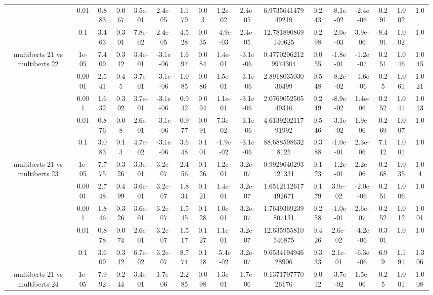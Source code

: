 \begin{tabular}{|c|c|c|c|c|c|c|c|c|c|c|c|c|c|c|c|c|}
 & 0.01 & 0.883 & 0.067 & 3.5e-01 & 2.4e-05 & 1.179 & 0.03 & 1.2e-02 & 2.4e-05 & 6.973564147949219 & 0.243 & -8.1e-02 & -2.4e-06 & 0.291 & 1.002 & 1.0 \\
 & 0.1 & 3.463 & 0.301 & 7.8e-02 & 2.4e-05 & 4.528 & 0.035 & -4.9e-03 & 2.4e-05 & 12.781890869140625 & 0.298 & -2.0e-03 & 3.9e-06 & 8.491 & 1.002 & 1.0 \\
\hline
\multirow{5}{*}{multiberts 21 vs multiberts 22} & 1e-05 & 7.409 & 0.312 & 3.4e-01 & -3.1e-06 & 1.697 & 0.084 & 1.4e-01 & -3.1e-06 & 0.47702062129974304 & 0.055 & -1.8e-01 & -1.2e-07 & 0.251 & 1.046 & 1.045 \\
 & 0.0001 & 2.541 & 0.45 & 3.7e-01 & -3.1e-06 & 1.085 & 0.086 & 1.5e-01 & -3.1e-06 & 2.891803503036499 & 0.548 & -8.2e-02 & -1.6e-06 & 0.25 & 1.061 & 1.021 \\
 & 0.001 & 1.632 & 0.302 & 3.7e-01 & -3.1e-06 & 0.942 & 0.094 & 1.1e-01 & -3.1e-06 & 2.076905250549316 & 0.249 & -8.9e-02 & 1.4e-06 & 0.252 & 1.041 & 1.013 \\
 & 0.01 & 0.876 & 0.08 & 2.6e-01 & -3.1e-06 & 0.977 & 0.091 & 7.3e-02 & -3.1e-06 & 4.613920211791992 & 0.546 & -3.1e-02 & 1.9e-06 & 0.269 & 1.007 & 1.0 \\
 & 0.1 & 3.083 & 0.13 & 4.7e-02 & -3.1e-06 & 3.648 & 0.101 & -1.9e-02 & -3.1e-06 & 88.6885986328125 & 0.388 & -1.0e-01 & 2.3e-06 & 7.112 & 1.001 & 1.0 \\
\hline
\multirow{5}{*}{multiberts 21 vs multiberts 23} & 1e-05 & 7.775 & 0.326 & 3.3e-01 & 3.2e-07 & 2.456 & 0.126 & 1.2e-01 & 3.2e-07 & 0.9929640293121331 & 0.123 & -1.2e-01 & 2.2e-06 & 0.268 & 1.035 & 1.04 \\
 & 0.0001 & 2.748 & 0.499 & 3.6e-01 & 3.2e-07 & 1.834 & 0.121 & 1.4e-01 & 3.2e-07 & 1.6512112617492671 & 0.179 & 3.9e-02 & -2.0e-06 & 0.251 & 1.006 & 1.0 \\
 & 0.001 & 1.846 & 0.326 & 3.6e-01 & 3.2e-07 & 1.545 & 0.128 & 1.0e-01 & 3.2e-07 & 1.7649369239807131 & 0.258 & -1.0e-01 & 2.6e-07 & 0.252 & 1.012 & 1.001 \\
 & 0.01 & 0.878 & 0.074 & 2.6e-01 & 3.2e-07 & 1.517 & 0.127 & 1.1e-01 & 3.2e-07 & 12.635955810546875 & 0.426 & 2.6e-02 & -4.2e-06 & 0.301 & 1.0 & 1.0 \\
 & 0.1 & 3.609 & 0.312 & 6.7e-02 & 3.2e-07 & 8.774 & 0.118 & -5.4e-02 & 3.2e-07 & 9.653419494628906 & 0.333 & 2.1e-01 & -6.3e-06 & 6.99 & 1.191 & 1.306 \\
\hline
\multirow{5}{*}{multiberts 21 vs multiberts 24} & 1e-05 & 7.992 & 0.244 & 3.4e-01 & 1.7e-06 & 2.285 & 0.098 & 1.3e-01 & 1.7e-06 & 0.137179777026176 & 0.012 & -3.7e-02 & 1.5e-06 & 0.25 & 1.001 & 1.008 \\

\end{tabular}
